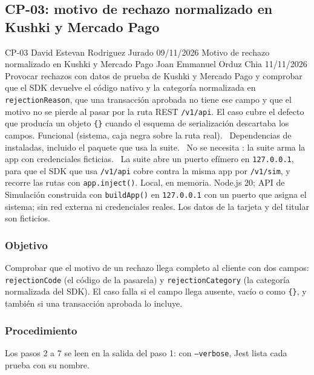 \subsection{CP-03: motivo de rechazo normalizado en Kushki y Mercado Pago}
\label{sec:cp03}

\FichaCaso
  {CP-03}
  {David Estevan Rodriguez Jurado}
  {09/11/2026}
  {Motivo de rechazo normalizado en Kushki y Mercado Pago}
  {Joan Emmanuel Orduz Chia}
  {11/11/2026}
  {Provocar rechazos con datos de prueba de Kushki y Mercado Pago y comprobar que el SDK devuelve el código nativo y la categoría normalizada en \texttt{rejectionReason}, que una transacción aprobada no tiene ese campo y que el motivo no se pierde al pasar por la ruta REST \texttt{/v1/api}. El caso cubre el defecto que producía un objeto \texttt{\{\}} cuando el esquema de serialización descartaba los campos.}
  {Funcional (sistema, caja negra sobre la ruta real).}
  {\textbullet\ Dependencias de  instaladas, incluido el paquete  que usa la suite.\newline
   \textbullet\ No se necesita : la suite arma la app con credenciales ficticias.\newline
   \textbullet\ La suite abre un puerto efímero en \texttt{127.0.0.1}, para que el SDK que usa \texttt{/v1/api} cobre contra la misma app por \texttt{/v1/sim}, y recorre las rutas con \texttt{app.inject()}.}
  {Local, en memoria. Node.js 20; API de Simulación construida con \texttt{buildApp()} en \texttt{127.0.0.1} con un puerto que asigna el sistema; sin red externa ni credenciales reales. Los datos de la tarjeta y del titular son ficticios.}

\subsubsection{Objetivo}

Comprobar que el motivo de un rechazo llega completo al cliente con dos campos: \texttt{rejectionCode} (el código de la pasarela) y \texttt{rejectionCategory} (la categoría normalizada del SDK). El caso falla si el campo llega ausente, vacío o como \texttt{\{\}}, y también si una transacción aprobada lo incluye.

\subsubsection{Procedimiento}

Los pasos 2 a 7 se leen en la salida del paso 1: con \texttt{--verbose}, Jest lista cada prueba con su nombre.

